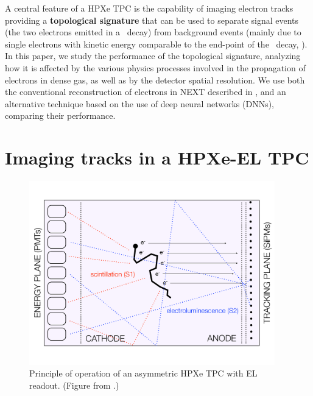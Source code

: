 \documentclass[a4paper,11pt]{article}
\begin{document}
A central feature of a HPXe TPC is the capability of imaging electron tracks providing a {\bf topological signature} that can be used to separate signal events (the two electrons emitted in a \bbonu\ decay) from background events (mainly due to single electrons with kinetic energy comparable to the end-point of the \bbonu\ decay, \Qbb). In this paper, we study the performance of the topological signature, analyzing how it is affected by the various physics processes involved in the propagation of electrons in dense gas, as well as by the detector spatial resolution. We use both the conventional reconstruction of electrons in NEXT described in \cite{NEXT_topology}, and an alternative technique based on the use of deep neural networks (DNNs), comparing their performance. 

\section{Imaging tracks in a HPXe-EL TPC}
\label{sec.topology}

\begin{figure}[!htb]
\centering
\includegraphics[width= 0.95\textwidth]{fig/nextEL.pdf}
\caption{Principle of operation of an asymmetric HPXe TPC with EL readout.  (Figure from \cite{Alvarez:2013gxa}.)} \label{fig.SS}
\end{figure}
\end{document}

